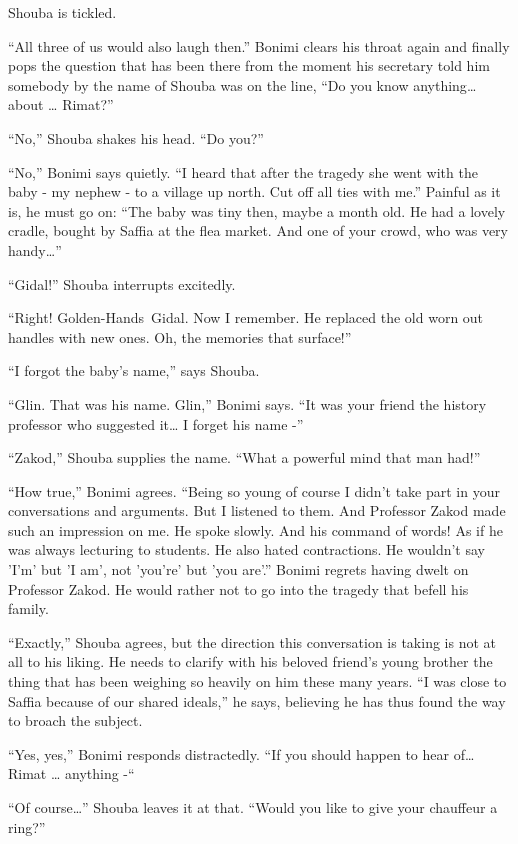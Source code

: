 \documentclass[twoside,11pt]{book}
\begin{document}
Shouba is tickled.

``All three of us would also laugh then.'' Bonimi clears his throat again and finally pops the
question that has been there from the moment his secretary told him somebody by the name of Shouba was on the line,
``Do you know anything{\dots} about {\dots} Rimat?'' 

``No,'' Shouba shakes his head. ``Do you?'' 

``No,'' Bonimi says quietly. ``I heard that after the tragedy she went with the
baby - my nephew - to a village up north. Cut off all ties with me.'' Painful as it is, he must go on: ``The baby was
tiny then, maybe a month old. He had a lovely cradle, bought by Saffia at the flea market. And one of your crowd, who
was very handy{\dots}''

``Gidal!'' Shouba interrupts excitedly.

``Right! Golden-Hands\ Gidal. Now I remember. He replaced the old worn out handles with new ones. Oh, the
memories that surface!''

``I forgot the baby's name,'' says Shouba.

``Glin. That was his name. Glin,'' Bonimi says. ``It was your friend the history
professor who suggested it{\dots} I forget his name -''

``Zakod,'' Shouba supplies the name. ``What a powerful mind that man
had!''

``How true,'' Bonimi agrees. ``Being so young of course I didn't take part in
your conversations and arguments. But I listened to them. And Professor Zakod made such an impression on me. He spoke
slowly. And his command of words! As if he was always lecturing to students. He also hated contractions. He wouldn't
say 'I'm' but 'I am', not 'you're' but 'you are'.'' Bonimi regrets having dwelt on Professor Zakod. He
would rather not to go into the tragedy that befell his family.

``Exactly,'' Shouba agrees, but the direction this conversation is taking is not at all to his
liking. He needs to clarify with his beloved friend's young brother the thing that has been weighing so heavily on him
these many years. ``I was close to Saffia because of our shared ideals,'' he says, believing
he has thus found the way to broach the subject. 

``Yes, yes,'' Bonimi responds distractedly. ``If you should happen to hear
of{\dots} Rimat {\dots} anything -``\ 

``Of course{{\dots}}'' Shouba leaves it at that.
``Would you like to give your chauffeur a ring?''
\end{document}
